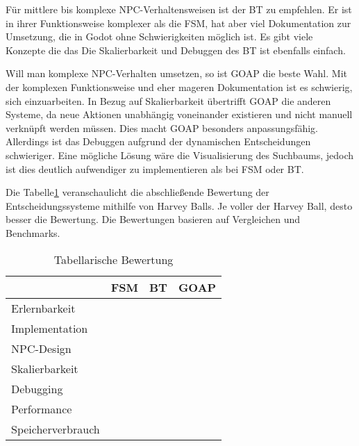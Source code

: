 F\"{u}r mittlere bis komplexe NPC-Verhaltensweisen ist der BT zu empfehlen. Er ist in ihrer Funktionsweise komplexer als die FSM, hat aber viel Dokumentation zur Umsetzung, die in Godot ohne Schwierigkeiten m\"{o}glich ist. Es gibt viele Konzepte die das 
Die Skalierbarkeit und Debuggen des BT ist ebenfalls einfach.

Will man komplexe NPC-Verhalten umsetzen, so ist GOAP die beste Wahl. Mit der komplexen Funktionsweise und eher mageren Dokumentation ist es schwierig, sich einzuarbeiten. In Bezug auf Skalierbarkeit \"{u}bertrifft GOAP die anderen Systeme, da neue Aktionen unabh\"{a}ngig voneinander existieren und nicht manuell verkn\"{u}pft werden m\"{u}ssen. Dies macht GOAP besonders anpassungsf\"{a}hig. Allerdings ist das Debuggen aufgrund der dynamischen Entscheidungen schwieriger. Eine m\"{o}gliche L\"{o}sung w\"{a}re die Visualisierung des Suchbaums, jedoch ist dies deutlich aufwendiger zu implementieren als bei FSM oder BT.

Die Tabelle\ref{tab:es vergleich tabelle} veranschaulicht die abschlie\ss{}ende Bewertung der Entscheidungssysteme mithilfe von Harvey Balls. Je voller der Harvey Ball, desto besser die Bewertung. Die Bewertungen basieren auf Vergleichen und Benchmarks.


\begin{table}[h]
  \caption{Tabellarische Bewertung}
  \label{tab:es vergleich tabelle}
  \centering
  \begin{tabular}{lccc}
    \toprule
    & FSM & BT & GOAP\\
    \midrule
		Erlernbarkeit & \harveyBallFull & \harveyBallThreeQuarter & \harveyBallHalf\\
    Implementation	& \harveyBallFull  & \harveyBallThreeQuarter  & \harveyBallHalf\\
		NPC-Design & \harveyBallQuarter & \harveyBallThreeQuarter & \harveyBallFull\\
    Skalierbarkeit	& \harveyBallQuarter & \harveyBallHalf & \harveyBallFull\\
    Debugging	& \harveyBallHalf & \harveyBallThreeQuarter & \harveyBallQuarter\\
		Performance & \harveyBallFull & \harveyBallThreeQuarter & \harveyBallHalf\\
		Speicherverbrauch & \harveyBallFull & \harveyBallFull & \harveyBallThreeQuarter\\
    \bottomrule
  \end{tabular}
\end{table}